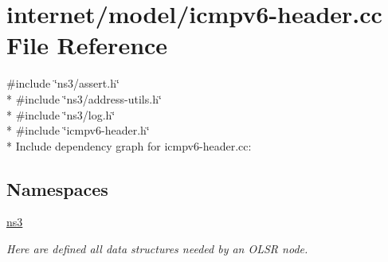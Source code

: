 \hypertarget{icmpv6-header_8cc}{}\section{internet/model/icmpv6-\/header.cc File Reference}
\label{icmpv6-header_8cc}
{\ttfamily \#include \char`\"{}ns3/assert.\+h\char`\"{}}\\*
{\ttfamily \#include \char`\"{}ns3/address-\/utils.\+h\char`\"{}}\\*
{\ttfamily \#include \char`\"{}ns3/log.\+h\char`\"{}}\\*
{\ttfamily \#include \char`\"{}icmpv6-\/header.\+h\char`\"{}}\\*
Include dependency graph for icmpv6-\/header.cc\+:
\subsection*{Namespaces}
\begin{DoxyCompactItemize}
\item 
 \hyperlink{namespacens3}{ns3}
\begin{DoxyCompactList}\small\item\em Here are defined all data structures needed by an O\+L\+SR node. \end{DoxyCompactList}\end{DoxyCompactItemize}
